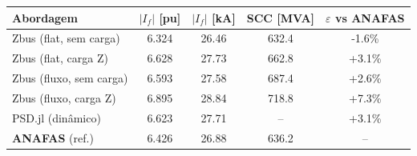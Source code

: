 \begin{tabular}{lcccc}
\toprule
Abordagem & $|I_f|$ [pu] & $|I_f|$ [kA] & SCC [MVA] & $\varepsilon$ vs ANAFAS \\
\midrule
Zbus (flat, sem carga) & 6.324 & 26.46 & 632.4 & -1.6\% \\
Zbus (flat, carga Z) & 6.628 & 27.73 & 662.8 & +3.1\% \\
Zbus (fluxo, sem carga) & 6.593 & 27.58 & 687.4 & +2.6\% \\
Zbus (fluxo, carga Z) & 6.895 & 28.84 & 718.8 & +7.3\% \\
PSD.jl (dinâmico) & 6.623 & 27.71 & -- & +3.1\% \\
\textbf{ANAFAS} (ref.) & 6.426 & 26.88 & 636.2 & -- \\
\bottomrule
\end{tabular}
